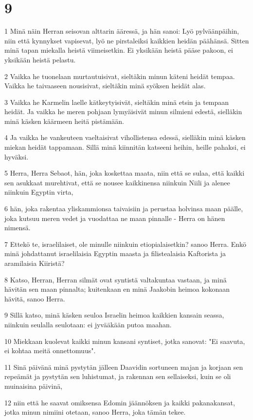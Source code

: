 \chapter{9}

\par 1 Minä näin Herran seisovan alttarin ääressä, ja hän sanoi: Lyö pylväänpäihin, niin että kynnykset vapisevat, lyö ne pirstaleiksi kaikkien heidän päähänsä. Sitten minä tapan miekalla heistä viimeisetkin. Ei yksikään heistä pääse pakoon, ei yksikään heistä pelastu.
\par 2 Vaikka he tuonelaan murtautuisivat, sieltäkin minun käteni heidät tempaa. Vaikka he taivaaseen nousisivat, sieltäkin minä syöksen heidät alas.
\par 3 Vaikka he Karmelin laelle kätkeytyisivät, sieltäkin minä etsin ja tempaan heidät. Ja vaikka he meren pohjaan lymyäisivät minun silmieni edestä, sielläkin minä käsken käärmeen heitä pistämään.
\par 4 Ja vaikka he vankeuteen vaeltaisivat vihollistensa edessä, sielläkin minä käsken miekan heidät tappamaan. Sillä minä kiinnitän katseeni heihin, heille pahaksi, ei hyväksi.
\par 5 Herra, Herra Sebaot, hän, joka koskettaa maata, niin että se sulaa, että kaikki sen asukkaat murehtivat, että se nousee kaikkinensa niinkuin Niili ja alenee niinkuin Egyptin virta,
\par 6 hän, joka rakentaa yliskammionsa taivaisiin ja perustaa holvinsa maan päälle, joka kutsuu meren vedet ja vuodattaa ne maan pinnalle - Herra on hänen nimensä.
\par 7 Ettekö te, israelilaiset, ole minulle niinkuin etiopialaisetkin? sanoo Herra. Enkö minä johdattanut israelilaisia Egyptin maasta ja filistealaisia Kaftorista ja aramilaisia Kiiristä?
\par 8 Katso, Herran, Herran silmät ovat syntistä valtakuntaa vastaan, ja minä hävitän sen maan pinnalta; kuitenkaan en minä Jaakobin heimoa kokonaan hävitä, sanoo Herra.
\par 9 Sillä katso, minä käsken seuloa Israelin heimoa kaikkien kansain seassa, niinkuin seulalla seulotaan: ei jyvääkään putoa maahan.
\par 10 Miekkaan kuolevat kaikki minun kansani syntiset, jotka sanovat: "Ei saavuta, ei kohtaa meitä onnettomuus".
\par 11 Sinä päivänä minä pystytän jälleen Daavidin sortuneen majan ja korjaan sen repeämät ja pystytän sen luhistumat, ja rakennan sen sellaiseksi, kuin se oli muinaisina päivinä,
\par 12 niin että he saavat omiksensa Edomin jäännöksen ja kaikki pakanakansat, jotka minun nimiini otetaan, sanoo Herra, joka tämän tekee.
